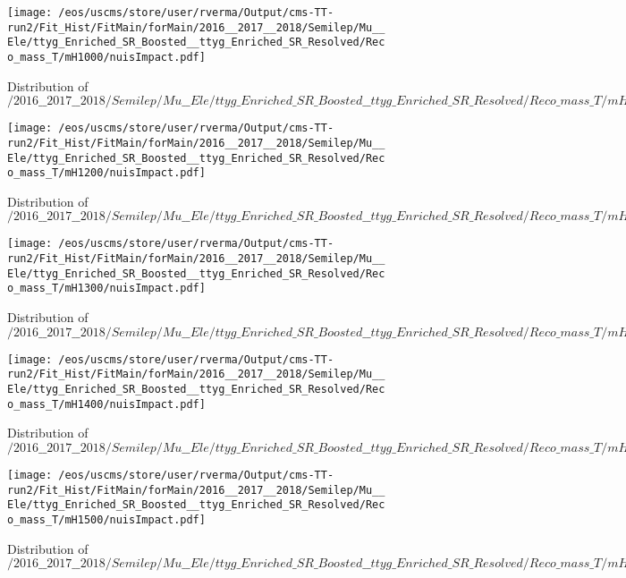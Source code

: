 \begin{figure}
\centering
\texttt{[image: /eos/uscms/store/user/rverma/Output/cms-TT-run2/Fit\_Hist/FitMain/forMain/2016\_\_2017\_\_2018/Semilep/Mu\_\_Ele/ttyg\_Enriched\_SR\_Boosted\_\_ttyg\_Enriched\_SR\_Resolved/Reco\_mass\_T/mH1000/nuisImpact.pdf]}
\caption{Distribution of $/2016\_\_2017\_\_2018/Semilep/Mu\_\_Ele/ttyg\_Enriched\_SR\_Boosted\_\_ttyg\_Enriched\_SR\_Resolved/Reco\_mass\_T/mH1000/nuisImpact.pdf$}
\end{figure}

\begin{figure}
\centering
\texttt{[image: /eos/uscms/store/user/rverma/Output/cms-TT-run2/Fit\_Hist/FitMain/forMain/2016\_\_2017\_\_2018/Semilep/Mu\_\_Ele/ttyg\_Enriched\_SR\_Boosted\_\_ttyg\_Enriched\_SR\_Resolved/Reco\_mass\_T/mH1200/nuisImpact.pdf]}
\caption{Distribution of $/2016\_\_2017\_\_2018/Semilep/Mu\_\_Ele/ttyg\_Enriched\_SR\_Boosted\_\_ttyg\_Enriched\_SR\_Resolved/Reco\_mass\_T/mH1200/nuisImpact.pdf$}
\end{figure}

\begin{figure}
\centering
\texttt{[image: /eos/uscms/store/user/rverma/Output/cms-TT-run2/Fit\_Hist/FitMain/forMain/2016\_\_2017\_\_2018/Semilep/Mu\_\_Ele/ttyg\_Enriched\_SR\_Boosted\_\_ttyg\_Enriched\_SR\_Resolved/Reco\_mass\_T/mH1300/nuisImpact.pdf]}
\caption{Distribution of $/2016\_\_2017\_\_2018/Semilep/Mu\_\_Ele/ttyg\_Enriched\_SR\_Boosted\_\_ttyg\_Enriched\_SR\_Resolved/Reco\_mass\_T/mH1300/nuisImpact.pdf$}
\end{figure}

\begin{figure}
\centering
\texttt{[image: /eos/uscms/store/user/rverma/Output/cms-TT-run2/Fit\_Hist/FitMain/forMain/2016\_\_2017\_\_2018/Semilep/Mu\_\_Ele/ttyg\_Enriched\_SR\_Boosted\_\_ttyg\_Enriched\_SR\_Resolved/Reco\_mass\_T/mH1400/nuisImpact.pdf]}
\caption{Distribution of $/2016\_\_2017\_\_2018/Semilep/Mu\_\_Ele/ttyg\_Enriched\_SR\_Boosted\_\_ttyg\_Enriched\_SR\_Resolved/Reco\_mass\_T/mH1400/nuisImpact.pdf$}
\end{figure}

\begin{figure}
\centering
\texttt{[image: /eos/uscms/store/user/rverma/Output/cms-TT-run2/Fit\_Hist/FitMain/forMain/2016\_\_2017\_\_2018/Semilep/Mu\_\_Ele/ttyg\_Enriched\_SR\_Boosted\_\_ttyg\_Enriched\_SR\_Resolved/Reco\_mass\_T/mH1500/nuisImpact.pdf]}
\caption{Distribution of $/2016\_\_2017\_\_2018/Semilep/Mu\_\_Ele/ttyg\_Enriched\_SR\_Boosted\_\_ttyg\_Enriched\_SR\_Resolved/Reco\_mass\_T/mH1500/nuisImpact.pdf$}
\end{figure}

